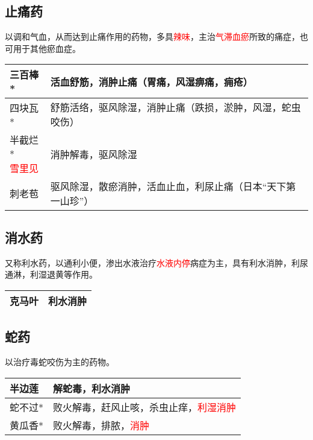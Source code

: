 \documentclass[cn,blue,12pt,normal,founder]{elegantnote}
\newcommand{\redt}[1]{\textcolor{red}{{}#1}}      %
\begin{document}
\subsection{止痛药}

以调和气血，从而达到止痛作用的药物，多具\redt{辣味}，主治\redt{气滞血瘀}所致的痛症，也可用于其他瘀血症。

\begin{table}[H]
  \begin{tabular}{|l|l|}
  \hline
  三百棒* & 活血舒筋，消肿止痛（胃痛，风湿痹痛，痈疮） \\ \hline
  四块瓦* & 舒筋活络，驱风除湿，消肿止痛（跌损，淤肿，风湿，蛇虫咬伤） \\ \hline
  \makecell[l]{半截烂* \\ \redt{雪里见}} & 消肿解毒，驱风除湿 \\ \hline
  刺老苞 & 驱风除湿，散瘀消肿，活血止血，利尿止痛（日本“天下第一山珍”） \\ \hline
  \end{tabular}
\end{table}

\subsection{消水药}

又称利水药，以通利小便，渗出水液治疗\redt{水液内停}病症为主，具有利水消肿，利尿通淋，利湿退黄等作用。

\begin{table}[H]
  \begin{tabular}{|l|l|}
  \hline
  克马叶 & 利水消肿 \\ \hline
  \end{tabular}
\end{table}

\subsection{蛇药}

以治疗毒蛇咬伤为主的药物。

\begin{table}[H]
  \begin{tabular}{|l|l|}
  \hline
  半边莲 & 解蛇毒，利水消肿 \\ \hline
  蛇不过* & 败火解毒，赶风止咳，杀虫止痒，\redt{利湿消肿}  \\ \hline
  黄瓜香* & 败火解毒，排脓，\redt{消肿} \\ \hline
  \end{tabular}
\end{table}
\end{document}
